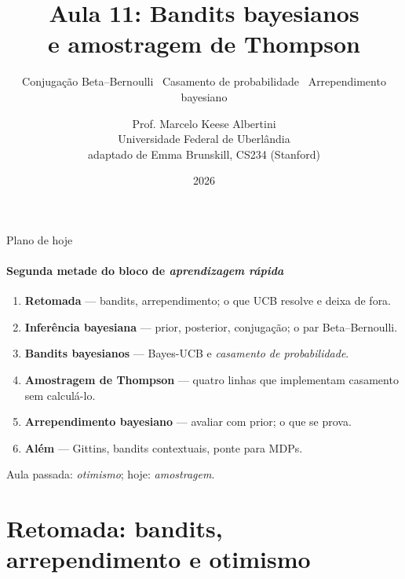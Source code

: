 \documentclass[aspectratio=169, 11pt]{beamer}
\title[Aula 11 — Bandits bayesianos]{Aula 11: Bandits bayesianos\\
  e amostragem de Thompson}
\subtitle[Aprendizagem por Reforço]{Conjugação Beta--Bernoulli \textbullet\ Casamento de
  probabilidade \textbullet\ Arrependimento bayesiano}
\author[Prof. Marcelo K. Albertini]{Prof. Marcelo Keese Albertini \\
  \footnotesize Universidade Federal de Uberlândia \\
  \footnotesize adaptado de Emma Brunskill, CS234 (Stanford)}
\institute{Universidade Federal de Uberlândia}
\date{2026}
\begin{document}
\begin{frame}\titlepage\end{frame}

\begin{frame}{Plano de hoje}
  \framesubtitle{Segunda metade do bloco de \emph{aprendizagem rápida}}
  \begin{enumerate}
    \item \textbf{Retomada} — bandits, arrependimento; o que UCB resolve
          e deixa de fora.
    \item \textbf{Inferência bayesiana} — prior, posterior, conjugação;
          o par Beta--Bernoulli.
    \item \textbf{Bandits bayesianos} — Bayes-UCB e \emph{casamento de
          probabilidade}.
    \item \textbf{Amostragem de Thompson} — quatro linhas que implementam
          casamento sem calculá-lo.
    \item \textbf{Arrependimento bayesiano} — avaliar com prior; o que se
          prova.
    \item \textbf{Além} — Gittins, bandits contextuais, ponte para MDPs.
  \end{enumerate}

  \smallskip
  {\small\color{rlCinza} Aula passada: \emph{otimismo}; hoje:
  \emph{amostragem}.}
\end{frame}

\section{Retomada: bandits, arrependimento e otimismo}
\end{document}
